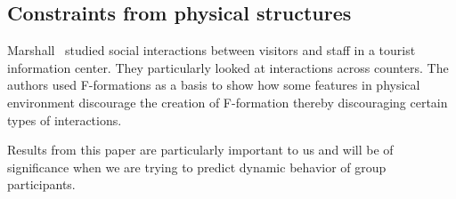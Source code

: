 
\subsection{Constraints from physical structures}

Marshall~\cite{Marshall:2011:UFA:1958824.1958893} studied social
interactions between visitors and staff in a tourist information
center. They particularly looked at interactions across counters. The
authors used F-formations as a basis to show how some features in
physical environment discourage the creation of F-formation thereby
discouraging certain types of interactions.

Results from this paper are particularly important to us and will be
of significance when we are trying to predict dynamic behavior of
group participants.
